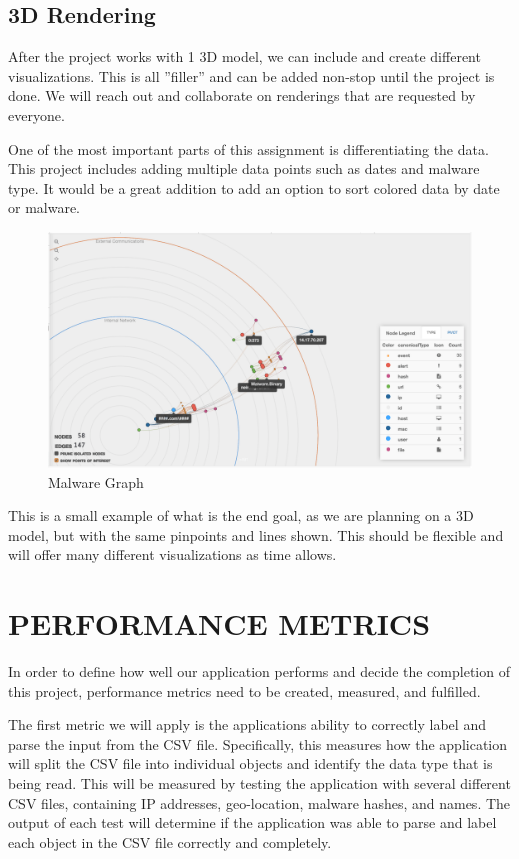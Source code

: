 \documentclass[journal,10pt,onecolumn,compsoc]{IEEEtran} \usepackage[margin=1.0in]{geometry} \usepackage{pdfpages}
\begin{document}
\subsection{3D Rendering}
After the project works with 1 3D model, we can include and create different visualizations. This is all ”filler” and can be added non-stop until the project is done. We will reach out and collaborate on renderings that are requested by everyone.

One of the most important parts of this assignment is differentiating the data. This project includes adding multiple data points such as dates and malware type. It would be a great addition to add an option to sort colored data by date or malware.
 
 \begin{figure}[H]
     \centering
          \caption{ Malware Graph}
            \includegraphics[width=\linewidth]{./Graph1.png}
 \end{figure}

This is a small example\cite{MalwareGraph} of what is the end goal, as we are planning on a 3D model, but with the same pinpoints and lines shown. This should be flexible and will offer many different visualizations as time allows.



\section{PERFORMANCE METRICS}
    In order to define how well our application performs and decide the completion of this project, performance metrics need to be created, measured, and fulfilled.

    The first metric we will apply is the applications ability to correctly label and parse the input from the CSV file. Specifically, this measures how the application will split the CSV file into individual objects and identify the data type that is being read. This will be measured by testing the application with several different CSV files, containing IP addresses, geo-location, malware hashes, and names. The output of each test will determine if the application was able to parse and label each object in the CSV file correctly and completely.
\end{document}
